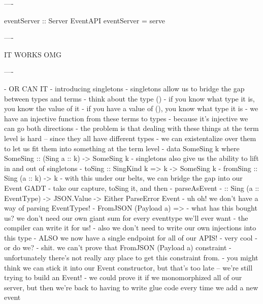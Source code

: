 ----

\begin{raw}
  eventServer :: Server EventAPI
  eventServer = serve 
\end{raw}

----

IT WORKS OMG

----




- OR CAN IT
  - introducing singletons
  - singletons allow us to bridge the gap between types and terms
  - think about the type ()
    - if you know what type it is, you know the value of it
    - if you have a value of (), you know what type it is
    - we have an injective function from these terms to types
      - because it's injective we can go both directions
  - the problem is that dealing with these things at the term level is hard -- since they all have different types
    - we can existentalize over them to let us fit them into something at the term level
    - data SomeSing k where SomeSing :: (Sing a :: k) -> SomeSing k
  - singletons also give us the ability to lift in and out of singletons
    - toSing :: SingKind k => k -> SomeSing k
    - fromSing :: Sing (a :: k) -> k
- with this under our belts, we can bridge the gap into our Event GADT
  - take our capture, toSing it, and then
  - parseAsEvent
    - :: Sing (a :: EventType) -> JSON.Value -> Either ParseError Event
  - uh oh! we don't have a way of parsing EventTypes!
    - FromJSON (Payload a) =>
- what has this bought us? we don't need our own giant sum for every eventtype we'll ever want
  - the compiler can write it for us!
  - also we don't need to write our own injections into this type
  - ALSO we now have a single endpoint for all of our APIS!
    - very cool
- or do we?
  - shit. we can't prove that FromJSON (Payload a) constraint
- unfortunately there's not really any place to get this constraint from.
  - you might think we can stick it into our Event constructor, but that's too late -- we're still trying to build an Event!
  - we could prove it if we monomorphized all of our server, but then we're back to having to write glue code every time we add a new event


